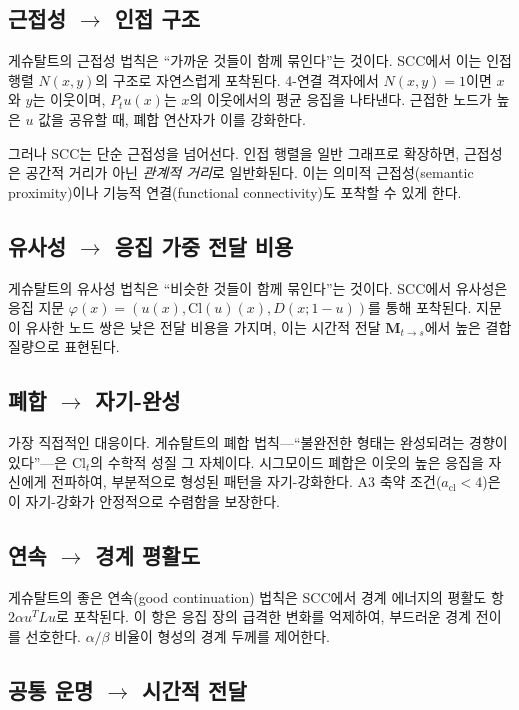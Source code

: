 \subsection{근접성 $\to$ 인접 구조}

게슈탈트의 근접성 법칙은 ``가까운 것들이 함께 묶인다''는 것이다. SCC에서 이는 인접 행렬 $N(x,y)$의 구조로 자연스럽게 포착된다. 4-연결 격자에서 $N(x,y) = 1$이면 $x$와 $y$는 이웃이며, $P_t u(x)$는 $x$의 이웃에서의 평균 응집을 나타낸다. 근접한 노드가 높은 $u$ 값을 공유할 때, 폐합 연산자가 이를 강화한다.

그러나 SCC는 단순 근접성을 넘어선다. 인접 행렬을 일반 그래프로 확장하면, 근접성은 공간적 거리가 아닌 \emph{관계적 거리}로 일반화된다. 이는 의미적 근접성(semantic proximity)이나 기능적 연결(functional connectivity)도 포착할 수 있게 한다.

\subsection{유사성 $\to$ 응집 가중 전달 비용}

게슈탈트의 유사성 법칙은 ``비슷한 것들이 함께 묶인다''는 것이다. SCC에서 유사성은 응집 지문 $\varphi(x) = (u(x), \mathrm{Cl}(u)(x), D(x; 1{-}u))$를 통해 포착된다. 지문이 유사한 노드 쌍은 낮은 전달 비용을 가지며, 이는 시간적 전달 $\mathbf{M}_{t \to s}$에서 높은 결합 질량으로 표현된다.

\subsection{폐합 $\to$ 자기-완성}

가장 직접적인 대응이다. 게슈탈트의 폐합 법칙---``불완전한 형태는 완성되려는 경향이 있다''---은 $\mathrm{Cl}_t$의 수학적 성질 그 자체이다. 시그모이드 폐합은 이웃의 높은 응집을 자신에게 전파하여, 부분적으로 형성된 패턴을 자기-강화한다. A3 축약 조건($a_{\mathrm{cl}} < 4$)은 이 자기-강화가 안정적으로 수렴함을 보장한다.

\subsection{연속 $\to$ 경계 평활도}

게슈탈트의 좋은 연속(good continuation) 법칙은 SCC에서 경계 에너지의 평활도 항 $2\alpha u^T L u$로 포착된다. 이 항은 응집 장의 급격한 변화를 억제하여, 부드러운 경계 전이를 선호한다. $\alpha / \beta$ 비율이 형성의 경계 두께를 제어한다.

\subsection{공통 운명 $\to$ 시간적 전달}

